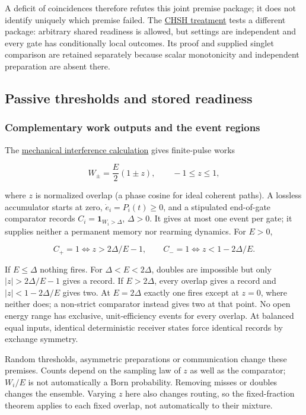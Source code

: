 \documentclass[11pt,a4paper]{article}
\begin{document}
A deficit of coincidences therefore refutes this joint premise package;
it does not identify uniquely which premise failed. The
\href{shared-readiness-chsh.md}{CHSH treatment} tests a different
package: arbitrary shared readiness is allowed, but settings are
independent and every gate has conditionally local outcomes. Its proof
and supplied singlet comparison are retained separately because scalar
monotonicity and independent preparation are absent there.

\hypertarget{passive-thresholds-and-stored-readiness}{%
\subsection{Passive thresholds and stored
readiness}\label{passive-thresholds-and-stored-readiness}}

\hypertarget{complementary-work-outputs-and-the-event-regions}{%
\subsubsection{Complementary work outputs and the event
regions}\label{complementary-work-outputs-and-the-event-regions}}

The \href{mechanical-interference-action.md}{mechanical interference
calculation} gives finite-pulse works

\[W_\pm=\frac E2(1\pm z),\qquad -1\le z\le1,\]

where \(z\) is normalized overlap (a phase cosine for ideal coherent
paths). A lossless accumulator starts at zero, \(\dot e_i=P_i(t)\ge0\),
and a stipulated end-of-gate comparator records
\(C_i=\mathbf1_{W_i>\Delta}\), \(\Delta>0\). It gives at most one event
per gate; it supplies neither a permanent memory nor rearming dynamics.
For \(E>0\),

\[C_+=1\iff z>2\Delta/E-1,\qquad
 C_-=1\iff z<1-2\Delta/E.\]

If \(E\le\Delta\) nothing fires. For \(\Delta<E<2\Delta\), doubles are
impossible but only \(|z|>2\Delta/E-1\) gives a record. If
\(E>2\Delta\), every overlap gives a record and \(|z|<1-2\Delta/E\)
gives two. At \(E=2\Delta\) exactly one fires except at \(z=0\), where
neither does; a non-strict comparator instead gives two at that point.
No open energy range has exclusive, unit-efficiency events for every
overlap. At balanced equal inputs, identical deterministic receiver
states force identical records by exchange symmetry.

Random thresholds, asymmetric preparations or communication change these
premises. Counts depend on the sampling law of \(z\) as well as the
comparator; \(W_i/E\) is not automatically a Born probability. Removing
misses or doubles changes the ensemble. Varying \(z\) here also changes
routing, so the fixed-fraction theorem applies to each fixed overlap,
not automatically to their mixture.
\end{document}
